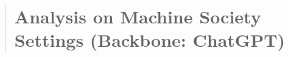 \documentclass[11pt]{article}
\begin{document}
\begin{abstract}
\section{Analysis on Machine Society Settings (Backbone: ChatGPT)}
\label{app:society_setting}







\end{abstract}
\end{document}
